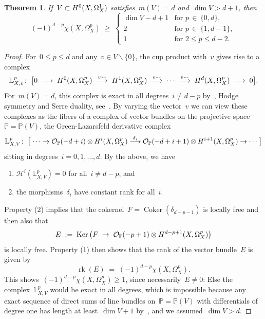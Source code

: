 \documentclass[a4paper]{amsart}
\newcommand{\bbL}{\mathbb{L}}
\newcommand{\bbP}{\mathbb{P}}
\newcommand{\cH}{\mathcal{H}}
\newcommand{\cO}{\mathcal{O}}
\newcommand{\rH}{\textup{H}}
\renewcommand{\ker}{\Ker}
\DeclareMathOperator{\rk}{rk}
\DeclareMathOperator{\Ker}{Ker}
\DeclareMathOperator{\coker}{Coker}
\renewcommand{\le}{\leqslant}
\renewcommand{\ge}{\geqslant}
\theoremstyle{plain}
\newtheorem{theorem}{Theorem}[section]
\theoremstyle{definition}
\numberwithin{equation}{section}
\begin{document}
\begin{theorem} \label{thm:hodge-estimate-for-subspace}
If~$V \subset \rH^0(X, \Omega^1_X)$ satisfies~$m(V) = d$ and~$\dim V > d + 1$, then
%
\[
 (-1)^{d-p}\chi(X, \Omega^p_X) \;\ge\; 
 \begin{cases} 
  \dim V - d +1& \text{for~$p \,\in\, \{0,d\}$},\\[0.1em]
   2 & \text{for~$p \,\in\, \{ 1, d - 1 \}$}, \\[0.1em]
 1 & \text{for~$2 \le p \le d-2$}.
 \end{cases} 
\]
\end{theorem} 
\begin{proof} 
For~$0\le p\le d$ and any~$v\in V\smallsetminus \{0\}$, the cup product with~$v$ gives rise to a complex
%
\[
 \bbL^p_{X,v}\colon \; 
 \bigl[ 0 \;\longrightarrow\; \rH^0(X, \Omega^p_X) 
 \;\stackrel{v \smile}{\longrightarrow}\; \rH^1(X, \Omega^p_X) 
 \;\stackrel{v \smile}{\longrightarrow}\; \cdots 
 \;\stackrel{v \smile}{\longrightarrow}\; \rH^d(X, \Omega^p_X) 
 \;\longrightarrow\; 0
 \bigr].
\]
%
For~$m(V)=d$, this complex is exact in all degrees~$i \neq d-p$ by~\cite[prop. 3.4]{GreenLazarsfeld}, Hodge symmetry and Serre duality, see~\cite[prop.~2.1]{Lombardi13}. By varying the vector~$v$ we can view these complexes as the fibers of a complex of vector bundles on the projective space~$\bbP=\bbP(V)$, the Green-Lazarsfeld derivative complex
%
\[
 \bbL^p_{X,V}\colon \; 
 \bigl[ 
 \; \cdots \rightarrow \cO_{\bbP}(-d+i)\otimes \rH^i(X, \Omega^p_X)\stackrel{\delta_i}{\longrightarrow} \cO_{\bbP}(-d+i+1)\otimes \rH^{i+1}(X, \Omega^p_X) 
 \rightarrow \cdots \;\bigr]
\]
%
sitting in degrees~$i=0,1,\dots, d$. By the above, we have
%
\begin{enumerate} 
\item $\cH^i(\bbL^p_{X,V})=0$ for all~$i\neq d-p$, and
\item the morphisms~$\delta_i$ have constant rank for all~$i$.
\end{enumerate} 
%
Property (2) implies that the cokernel~$F=\coker(\delta_{d-p-1})$ is locally free and then also that
%
\[
 E \;:=\; \ker\left(F \;\rightarrow\; \cO_{\bbP}(-p+1)\otimes \rH^{d-p+1}(X, \Omega^p_X) \right)
\]
%
is locally free. Property (1) then shows that the rank of the vector bundle~$E$ is given by
%
\[
 \rk(E) \;=\; (-1)^{d-p} \chi(X, \Omega^p_X).
\]
%
This shows~$(-1)^{d-p} \chi(X, \Omega^p_X)\ge 1$, since necessarily~$E\neq 0$: Else the complex~$\bbL^p_{X,V}$ would be exact in all degrees, which is impossible because any exact sequence of direct sums of line bundles on~$\bbP=\bbP(V)$ with differentials of degree one has length at least~$\dim V+1$ by~\cite[lemma 2.2]{Lombardi13}, and we assumed~$\dim V>d$.
\medskip 


\end{proof}
\end{document}
